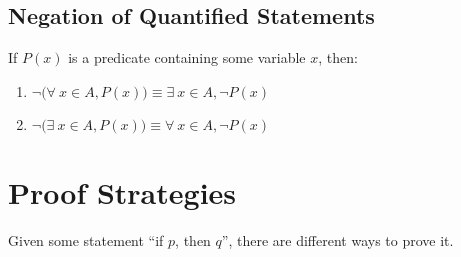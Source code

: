 \documentclass[../notes.tex]{subfiles}
\begin{document}
			\subsection{Negation of Quantified Statements}
				If $P(x)$ is a predicate containing some variable $x$, then:
				\begin{enumerate}
					\item $\lnot \bigl(\forall \: x \in A, P(x)\bigr) \equiv \exists \: x \in A, \lnot P(x)$
					\item $\lnot \bigl(\exists \: x \in A, P(x)\bigr) \equiv \forall \: x \in A, \lnot P(x)$
				\end{enumerate}
				\pagebreak
		\section{Proof Strategies}
				Given some statement ``if $p$, then $q$'', there are different ways to prove it.
\end{document}
